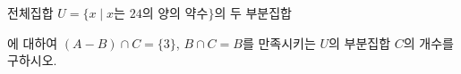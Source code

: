 전체집합 $U=\{x \mid x$는 $24$의 양의 약수$\}$의 두 부분집합 \par\smallskip{}\par\smallskip\noindent 에 대하여 $(A-B)\cap C=\{3\}$, $B\cap C=B$를 만족시키는 $U$의 부분집합 $C$의 개수를 구하시오.

